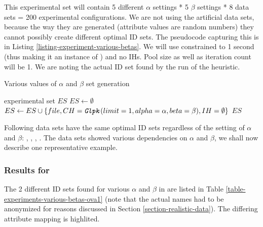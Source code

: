 This experimental set will contain 5 different $\alpha$ settings * 5 $\beta$ settings * 8 data sets = 200 experimental configurations. We are not using the artificial data sets, because the way they are generated (attribute values are random numbers) they cannot possibly create different optimal ID sets. The pseudocode capturing this is in Listing \ref{listing-experiment-various-betas}. We will use  constrained to 1 second (thus making it an instance of ) and no IHs. Pool size as well as iteration count will be 1. We are noting the actual ID set found by the run of the heuristic.

\begin{algorithm}
\caption{Various values of $\alpha$ and $\beta$ set generation}
\label{listing-experiment-various-betas}
\begin{algorithmic}
\ENSURE experimental set $ES$
\STATE $ES \gets \emptyset$
    	\STATE $ES \gets ES \cup \{file, CH = \texttt{\textit{Glpk}}(limit = 1, alpha = \alpha, beta = \beta), IH = \emptyset\}$
    \ENDFOR
  \ENDFOR
\ENDFOR
\RETURN $ES$
\end{algorithmic}
\end{algorithm}

Following data sets have the same optimal ID sets regardless of the setting of $\alpha$ and $\beta$: , , , . The  data sets showed various dependencies on $\alpha$ and $\beta$, we shall now describe one representative example.

\subsubsection{Results for }

The 2 different ID sets found for various $\alpha$ and $\beta$ in  are listed in Table \ref{table-experiments-various-betas-ova1} (note that the actual names had to be anonymized for reasons discussed in Section \ref{section-realistic-data}). The differing attribute mapping is highlited.

